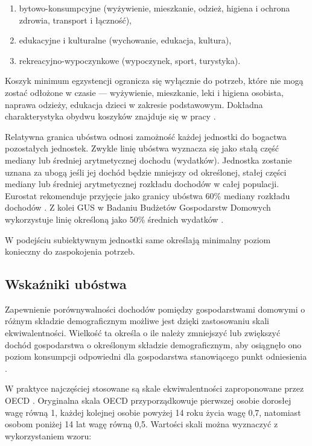 \begin{enumerate}
\item bytowo-konsumpcyjne (wyżywienie, mieszkanie, odzież, higiena i ochrona zdrowia, transport i łączność),
\item edukacyjne i kulturalne (wychowanie, edukacja, kultura),
\item rekreacyjno-wypoczynkowe (wypoczynek, sport, turystyka).
\end{enumerate}

Koszyk minimum egzystencji ogranicza się wyłącznie do potrzeb, które nie mogą zostać odłożone w czasie --- wyżywienie, mieszkanie, leki i higiena osobista, naprawa odzieży, edukacja dzieci w zakresie podstawowym. Dokładna charakterystyka obydwu koszyków znajduje się w pracy \citep{kurowski2002}.

Relatywna granica ubóstwa odnosi zamożność każdej jednostki do bogactwa pozostałych jednostek. Zwykle linię ubóstwa wyznacza się jako stałą część mediany lub średniej arytmetycznej dochodu (wydatków). Jednostka zostanie uznana za ubogą jeśli jej dochód będzie mniejszy od określonej, stałej części mediany lub średniej arytmetycznej rozkładu dochodów w całej populacji. Eurostat rekomenduje przyjęcie jako granicy ubóstwa 60\% mediany rozkładu dochodów \citep{eurostat2010}. Z kolei GUS w Badaniu Budżetów Gospodarstw Domowych wykorzystuje linię określoną jako 50\% średnich wydatków \citep{ubostwo-gus2013}. 

W podejściu subiektywnym jednostki same określają minimalny poziom konieczny do zaspokojenia potrzeb. 

\subsection{Wskaźniki ubóstwa}\label{pr:wskazniki-ubostwa}

Zapewnienie porównywalności dochodów pomiędzy gospodarstwami domowymi o różnym składzie demograficznym możliwe jest dzięki zastosowaniu skali ekwiwalentności. Wielkość ta określa o ile należy zmniejszyć lub zwiększyć dochód gospodarstwa o określonym składzie demograficznym, aby osiągnęło ono poziom konsumpcji odpowiedni dla gospodarstwa stanowiącego punkt odniesienia \citep{panek2007}.

W praktyce najczęściej stosowane są skale ekwiwalentności zaproponowane przez OECD \citep{atkinson2003}. Oryginalna skala OECD przyporządkowuje pierwszej osobie dorosłej wagę równą 1, każdej kolejnej osobie powyżej 14 roku życia wagę 0,7, natomiast osobom poniżej 14 lat wagę równą 0,5. Wartości skali można wyznaczyć z wykorzystaniem wzoru:

